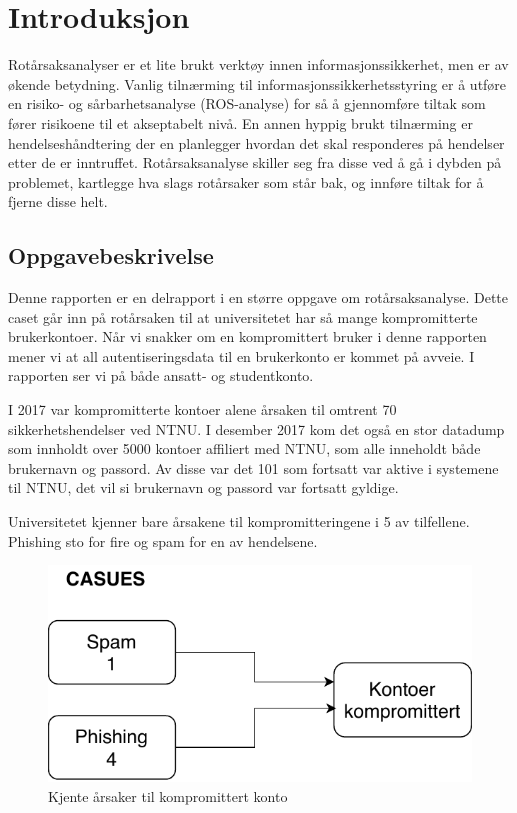 \chapter{Introduksjon}
\fixme Rotårsaksanalyser er et lite brukt verktøy innen informasjonssikkerhet, men er av økende betydning. Vanlig tilnærming til informasjonssikkerhetsstyring er å utføre en risiko- og sårbarhetsanalyse (ROS-analyse) for så å gjennomføre tiltak som fører risikoene til et akseptabelt nivå. En annen hyppig brukt tilnærming er hendelseshåndtering der en planlegger hvordan det skal responderes på hendelser etter de er inntruffet. Rotårsaksanalyse skiller seg fra disse ved å gå i dybden på problemet, kartlegge hva slags rotårsaker som står bak, og innføre tiltak for å fjerne disse helt.

\section{Oppgavebeskrivelse}
Denne rapporten er en delrapport i en større oppgave om rotårsaksanalyse. Dette caset går inn på rotårsaken til at universitetet har så mange kompromitterte brukerkontoer. Når vi snakker om en kompromittert bruker i denne rapporten mener vi at all autentiseringsdata til en brukerkonto er kommet på avveie. I rapporten ser vi på både ansatt- og studentkonto. 

I 2017 var kompromitterte kontoer alene årsaken til omtrent 70 sikkerhetshendelser ved NTNU. I desember 2017 kom det også en stor datadump som innholdt over 5000 kontoer affiliert med NTNU, som alle inneholdt både brukernavn og passord. Av disse var det 101 som fortsatt var aktive i systemene til NTNU, det vil si brukernavn og passord var fortsatt gyldige.

Universitetet kjenner bare årsakene til kompromitteringene i 5 av tilfellene. Phishing sto for fire og spam for en av hendelsene. 

\begin{figure}[H]
    \centering
    \includegraphics[scale=0.6]{case_2/bilder/kjente_arsaker.pdf}
    \caption[Kjente årsaker til kompromittert konto]{Kjente årsaker til kompromittert konto}
    \label{fig:kjente-arsaker-kompromittert-konto}
\end{figure}


